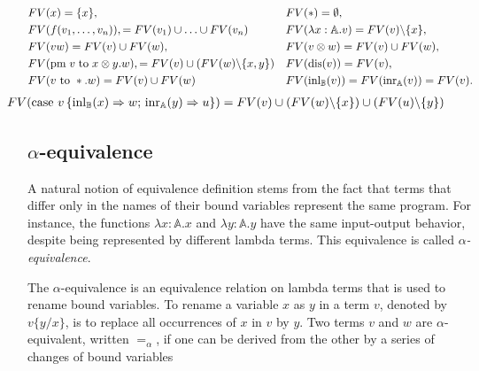 \begin{equation*}
\begin{split}
&FV(x) = \{x\}, &&  FV(*) = \emptyset,  \\
&FV(f(v_1, \ldots, v_n)), = FV(v_1) \cup \ldots \cup FV(v_n)&& FV(\lambda x: \mathbb{A}. v) = FV(v) \backslash \{x\}, \\
&FV(v w) = FV(v) \cup FV(w), && FV(v \otimes w) = FV(v) \cup FV(w), \\
& FV(\text{pm} \hspace{3 pt} v \hspace{3 pt} \text{to} \hspace{3 pt} x \otimes y. w), = FV(v) \cup (FV(w)  \backslash \{x,y\}) && FV(\text{dis}(v)) = FV(v),\\
&FV(v \text{ to } *.w) = FV(v) \cup FV(w)  &&  FV(\text{inl}_{\mathbb{B}} (v)) =  FV(\text{inr}_{\mathbb{A}} (v)) = FV(v). \\
\end{split}
\end{equation*}
\vspace{-20pt}
\begin{equation*}
  \begin{split}
& \hspace{-30pt} FV(\text{case } v \,   \{\text{inl}_{\typeB} (x) \Rightarrow w ; \, \text{inr}_{\typeA} (y) \Rightarrow u\}) = FV(v) \cup  (FV(w) \backslash \{x\}) \cup (FV(u)\backslash \{y\})
\end{split}
\end{equation*}


\subsection{$\alpha$-equivalence}

 
A natural notion of equivalence definition stems from the fact that terms that differ only in the names of their bound variables represent the same program. For instance, the functions $\lambda x:\mathbb{A}.x $ and $\lambda y:\mathbb{A}.y$ have the same input-output behavior, despite being represented by different lambda terms. This equivalence is called $\alpha$\emph{-equivalence}.

\begin{definition}
  The $\alpha$-equivalence is an equivalence relation on lambda terms that is used to rename bound variables. To rename a variable $x$ as $y$ in a term $v$, denoted by $v\{y/x\}$, is to replace all occurrences of $x$ in $v$ by $y$. Two terms $v$ and $w$ are $\alpha$-equivalent, written $=_{\alpha}$, if one can be derived from the other by a series of
  changes of bound variables
\end{definition}

